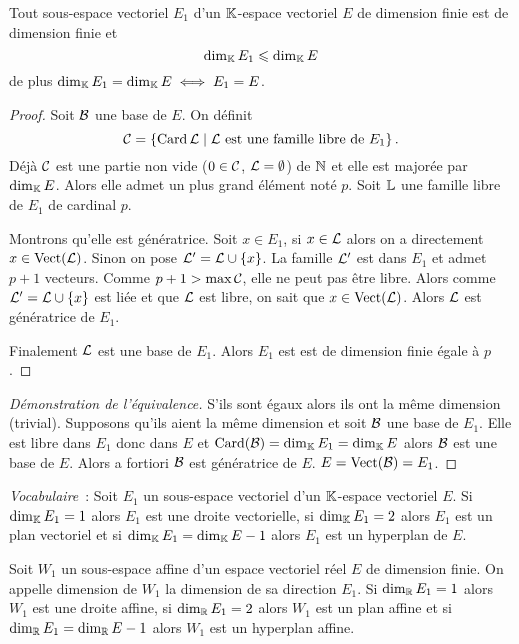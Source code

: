 \begin{theo}
  Tout sous-espace vectoriel \(E_1\) d'un \(\mathbb{K}\)-espace vectoriel \(E\) de dimension finie est de dimension finie et
  \begin{equation}
    \operatorname{dim}_{\mathbb{K}} E_1 \leqslant \operatorname{dim}_{\mathbb{K}} E
  \end{equation}
de plus \(\operatorname{dim}_{\mathbb{K}} E_1 = \operatorname{dim}_{\mathbb{K}} E \iff E_1 =E\).
\end{theo}
\begin{proof}
  Soit \(\mathcal{B}\) une base de \(E\). On définit 
\begin{equation}
  \mathcal{C}=\left\{\operatorname{Card} \mathcal{L}\mathrel{}\middle|\mathrel{}\mathcal{L} \text{~est une famille libre de } E_1\right\}. 
\end{equation}
Déjà \(\mathcal{C}\) est une partie non vide (\(0 \in \mathcal{C}\), \(\mathcal{L}=\emptyset\)) de \(\mathbb{N}\) et elle est majorée par \(\operatorname{dim}_{\mathbb{K}} E\). Alors elle admet un plus grand élément noté \(p\). Soit \(\mathbb{L}\) une famille libre de \(E_1\) de cardinal \(p\). 

Montrons qu'elle est génératrice. Soit \(x \in E_1\), si \(x \in \mathcal{L}\) alors on a directement \(x \in \operatorname{Vect}(\mathcal{L})\). Sinon on pose \(\mathcal{L}' = \mathcal{L} \cup \{x\}\). La famille \(\mathcal{L}'\) est dans \(E_1\) et admet \(p+1\) vecteurs. Comme \(p+1 > \max \mathcal{C}\), elle ne peut pas être libre. Alors comme \(\mathcal{L}' =\mathcal{L}\cup\{x\}\) est liée et que \(\mathcal{L}\) est libre, on sait que \(x \in \operatorname{Vect}(\mathcal{L})\). Alors \(\mathcal{L}\) est génératrice de \(E_1\).

Finalement \(\mathcal{L}\) est une base de \(E_1\). Alors \(E_1\) est est de dimension finie égale à \(p\).
\end{proof}
\begin{proof}[Démonstration de l'équivalence]
  S'ils sont égaux alors ils ont la même dimension (trivial). Supposons qu'ils aient la même dimension et soit \(\mathcal{B}\) une base de \(E_1\). Elle est libre dans \(E_1\) donc dans \(E\) et \(\operatorname{Card}(\mathcal{B})=\operatorname{dim}_{\mathbb{K}} E_1=\operatorname{dim}_{\mathbb{K}} E\) alors \(\mathcal{B}\) est une base de \(E\). Alors a fortiori \(\mathcal{B}\) est génératrice de \(E\). \(E=\operatorname{Vect}(\mathcal{B})=E_1\).
\end{proof}

\emph{Vocabulaire}~: Soit \(E_1\) un sous-espace vectoriel d'un \(\mathbb{K}\)-espace vectoriel \(E\). Si \(\operatorname{dim}_{\mathbb{K}} E_1=1\) alors \(E_1\) est une droite vectorielle, si \(\operatorname{dim}_{\mathbb{K}} E_1=2\) alors \(E_1\) est un plan vectoriel et si \(\operatorname{dim}_{\mathbb{K}} E_1 = \operatorname{dim}_{\mathbb{K}} E -1\) alors \(E_1\) est un hyperplan de \(E\).

\begin{defdef}
  Soit \(W_1\) un sous-espace affine d'un espace vectoriel réel \(E\) de dimension finie. On appelle dimension de \(W_1\) la dimension de sa direction \(E_1\). Si \(\operatorname{dim}_{\mathbb{R}} E_1=1\) alors \(W_1\) est une droite affine, si \(\operatorname{dim}_{\mathbb{R}} E_1=2\) alors \(W_1\) est un plan affine et si \(\operatorname{dim}_{\mathbb{R}} E_1=\operatorname{dim}_{\mathbb{R}} E -1 \) alors \(W_1\) est un hyperplan affine.
\end{defdef}

